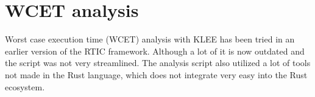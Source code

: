\section{WCET analysis}
Worst case execution time (WCET) analysis with KLEE has been tried in an earlier
version of the RTIC framework\cite{lindner}. Although a lot of it is now
outdated and the script was not very streamlined. The analysis script also 
utilized a lot of tools not made in the Rust language, which does not integrate
very easy into the Rust ecosystem.

